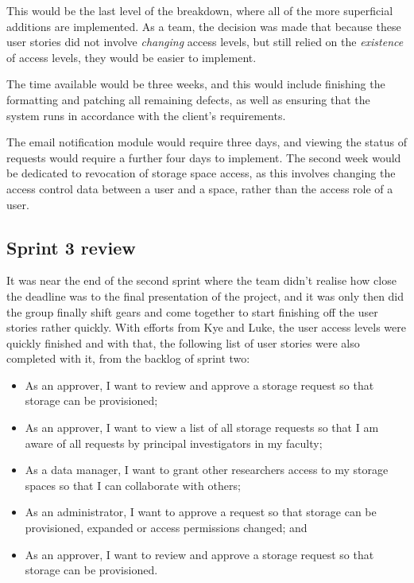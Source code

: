 \documentclass[a4paper,titlepage,12pt]{article}
\begin{document}
This would be the last level of the breakdown, where all of the more
superficial additions are implemented. As a team, the decision was made that
because these user stories did not involve \textit{changing} access levels, but
still relied on the \textit{existence} of access levels, they would be easier
to implement.

The time available would be three weeks, and this would include finishing the
formatting and patching all remaining defects, as well as ensuring that the
system runs in accordance with the client's requirements.

The email notification module would require three days, and viewing the status
of requests would require a further four days to implement. The second week
would be dedicated to revocation of storage space access, as this involves
changing the access control data between a user and a space, rather than the
access role of a user.

\subsection{Sprint 3 review}

It was near the end of the second sprint where the team didn't realise how
close the deadline was to the final presentation of the project, and it was
only then did the group finally shift gears and come together to start
finishing off the user stories rather quickly. With efforts from Kye and Luke,
the user access levels were quickly finished and with that, the following list
of user stories were also completed with it, from the backlog of sprint two:

\begin{itemize}
	\item As an approver, I want to review and approve a storage request so
	      that storage can be provisioned;
	\item As an approver, I want to view a list of all storage requests so
	      that I am aware of all requests by principal investigators in my
	      faculty;
	\item As a data manager, I want to grant other researchers access to my
	      storage spaces so that I can collaborate with others;
	\item As an administrator, I want to approve a request so that storage
	      can be provisioned, expanded or access permissions changed; and
	\item As an approver, I want to review and approve a storage request so
	      that storage can be provisioned.
\end{itemize}
\end{document}
